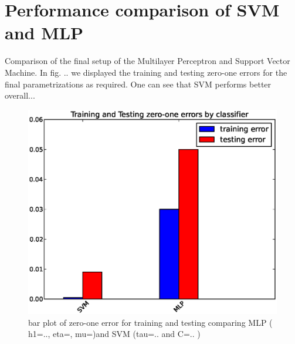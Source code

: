 \section{Performance comparison of SVM and MLP}
Comparison of the final setup of the Multilayer Perceptron and Support Vector Machine. In fig. .. we displayed the training and testing zero-one errors for the final parametrizations as required. One can see that SVM performs better overall...

\begin{figure}[!ht]
	\centering
	\includegraphics[width=.6\textwidth]{svm/fake_bar_plot.eps}
	\caption{bar plot of zero-one error for training and testing comparing MLP ( h1=.., eta=, mu=)and SVM (tau=.. and C=.. )}
	\label{fig:comparison}
\end{figure}